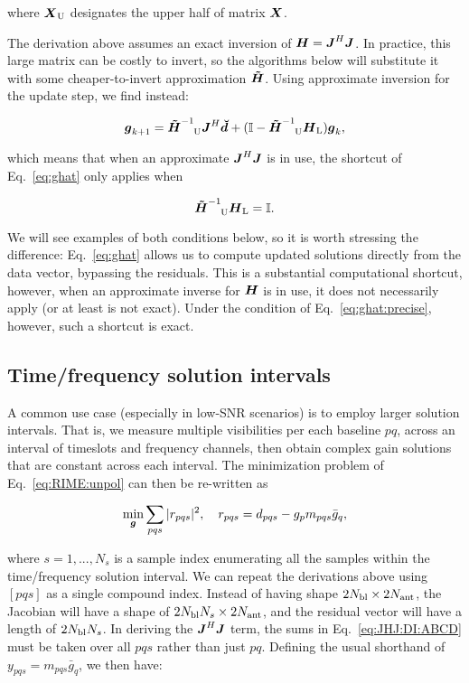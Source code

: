 \documentclass[useAMS,usenatbib]{mn2e}
\newcommand{\II}{\mathbb{I}}
\newcommand{\vecg}{\bmath{g}}
\newcommand{\mat}[1]{{\bmath{#1}}}
\newcommand{\JJ}{\mat{J}} %
\newcommand{\HH}{\mat{H}} %
\newcommand{\HHa}{\mat{\tilde{H}}} %
\newcommand{\JHJ}{\JJ^H\JJ} %
\newcommand{\AUG}[1]{\bmath{\breve{#1}}}
\newcommand{\Dd}{\AUG{d}}
\newcommand{\TOP}{\mathrm{U}}%
\newcommand{\LEFT}{\mathrm{L}}
\begin{document}
where $\bmath{X}_\TOP$ designates the upper half of matrix $\bmath{X}$. 

The derivation above assumes an exact inversion of $\HH=\JHJ$. In practice, this large matrix can be costly to invert, 
so the algorithms below will substitute it with some cheaper-to-invert approximation $\HHa$. Using approximate inversion 
for the update step, we find instead:

\begin{equation}
\label{eq:ghat:approx}
\vecg_{k+1} = \HHa^{-1}_{~~~\TOP} \JJ^H \Dd + (\II - \HHa^{-1}_{~~~\TOP} \HH_\LEFT )\vecg_k,
\end{equation}

which means that when an approximate $\JHJ$ is in use, the shortcut of Eq.~\ref{eq:ghat} only applies when 

\begin{equation}
\label{eq:ghat:precise}
\HHa^{-1}_{~~~\TOP} \HH_\LEFT=\II.
\end{equation}

We will see examples of both conditions below, so it is worth stressing the difference: Eq.~\ref{eq:ghat}
allows us to compute updated solutions directly from the data vector, bypassing the residuals. This is a 
substantial computational shortcut, however, when an approximate inverse for $\HH$ is in use, it 
does not necessarily apply (or at least is not exact). Under the condition of Eq.~\ref{eq:ghat:precise}, however, 
such a shortcut is exact.


\subsection{Time/frequency solution intervals}
\label{sec:unpol:DI:avg}
\label{sec:solution-intervals}

\newcommand{\Ns}{N_s}

A common use case (especially in low-SNR scenarios) is to employ larger solution intervals. 
That is, we measure multiple visibilities per each baseline $pq$, across an interval of timeslots and
frequency channels, then obtain complex gain solutions that are constant across each interval. The 
minimization problem of Eq.~\ref{eq:RIME:unpol} can then be re-written as

\begin{equation}
\label{eq:cal:DI:tf}
\min_{\bmath{g}}\sum_{pqs}|r_{pqs}|^2, 
~~~r_{pqs} = d_{pqs}-g_p m_{pqs} \bar{g}_q, 
\end{equation}

where $s=1,...,N_s$ is a sample index enumerating all the samples within the 
time/frequency solution interval. We can repeat the derivations above using  $[pqs]$ as a
single compound index. Instead of having shape $2N_\mathrm{bl}\times2N_\mathrm{ant}$, the Jacobian 
will have a shape of $2\Nbl\Ns\times 2\Na$, and the residual vector will have a length of 
$2\Nbl\Ns$. In deriving the $\JHJ$ term, the sums in Eq.~\ref{eq:JHJ:DI:ABCD} must be taken over all $pqs$ 
rather than just $pq$. Defining the usual shorthand of 
$y_{pqs}=m_{pqs}\bar{g}_q$, we then have:
\end{document}
